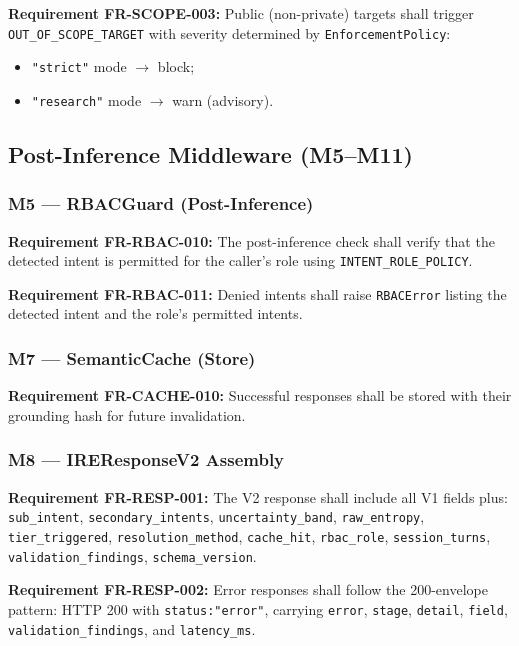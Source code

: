 ﻿\documentclass[10pt,journal,onecolumn]{IEEEtran}
\newcommand{\reqid}[1]{\textbf{#1}}
\begin{document}
\reqid{Requirement FR-SCOPE-003:} Public (non-private) targets shall trigger \texttt{OUT\_OF\_SCOPE\_TARGET} with severity determined by \texttt{EnforcementPolicy}:
\begin{itemize}
\item \texttt{"strict"} mode $\rightarrow$ block;
\item \texttt{"research"} mode $\rightarrow$ warn (advisory).
\end{itemize}

\subsection{Post-Inference Middleware (M5--M11)}

\subsubsection{M5 --- RBACGuard (Post-Inference)}
\reqid{Requirement FR-RBAC-010:} The post-inference check shall verify that the detected intent is permitted for the caller's role using \texttt{INTENT\_ROLE\_POLICY}.

\reqid{Requirement FR-RBAC-011:} Denied intents shall raise \texttt{RBACError} listing the detected intent and the role's permitted intents.

\subsubsection{M7 --- SemanticCache (Store)}
\reqid{Requirement FR-CACHE-010:} Successful responses shall be stored with their grounding hash for future invalidation.

\subsubsection{M8 --- IREResponseV2 Assembly}
\reqid{Requirement FR-RESP-001:} The V2 response shall include all V1 fields plus: \texttt{sub\_intent}, \texttt{secondary\_intents}, \texttt{uncertainty\_band}, \texttt{raw\_entropy}, \texttt{tier\_triggered}, \texttt{resolution\_method}, \texttt{cache\_hit}, \texttt{rbac\_role}, \texttt{session\_turns}, \texttt{validation\_findings}, \texttt{schema\_version}.

\reqid{Requirement FR-RESP-002:} Error responses shall follow the 200-envelope pattern: HTTP 200 with \texttt{status:"error"}, carrying \texttt{error}, \texttt{stage}, \texttt{detail}, \texttt{field}, \texttt{validation\_findings}, and \texttt{latency\_ms}.
\end{document}
